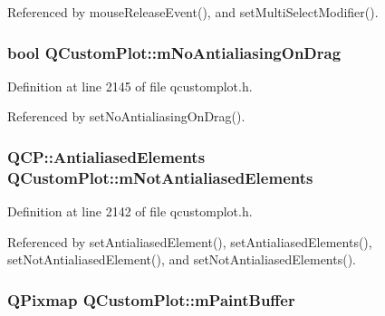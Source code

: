 Referenced by mouse\+Release\+Event(), and set\+Multi\+Select\+Modifier().

\hypertarget{class_q_custom_plot_ac83df968435f6b8ec79f2993ab9124e8}{}
\subsubsection[{m\+No\+Antialiasing\+On\+Drag}]{\setlength{\rightskip}{0pt plus 5cm}bool Q\+Custom\+Plot\+::m\+No\+Antialiasing\+On\+Drag\hspace{0.3cm}{\ttfamily [protected]}}\label{class_q_custom_plot_ac83df968435f6b8ec79f2993ab9124e8}


Definition at line 2145 of file qcustomplot.\+h.



Referenced by set\+No\+Antialiasing\+On\+Drag().

\hypertarget{class_q_custom_plot_a2b6ebcad00a90ba07f146cefcd4293da}{}
\subsubsection[{m\+Not\+Antialiased\+Elements}]{\setlength{\rightskip}{0pt plus 5cm}Q\+C\+P\+::\+Antialiased\+Elements Q\+Custom\+Plot\+::m\+Not\+Antialiased\+Elements\hspace{0.3cm}{\ttfamily [protected]}}\label{class_q_custom_plot_a2b6ebcad00a90ba07f146cefcd4293da}


Definition at line 2142 of file qcustomplot.\+h.



Referenced by set\+Antialiased\+Element(), set\+Antialiased\+Elements(), set\+Not\+Antialiased\+Element(), and set\+Not\+Antialiased\+Elements().

\hypertarget{class_q_custom_plot_a753630df96e0672098d9e88bd41d1913}{}
\subsubsection[{m\+Paint\+Buffer}]{\setlength{\rightskip}{0pt plus 5cm}Q\+Pixmap Q\+Custom\+Plot\+::m\+Paint\+Buffer\hspace{0.3cm}{\ttfamily [protected]}}\label{class_q_custom_plot_a753630df96e0672098d9e88bd41d1913}


